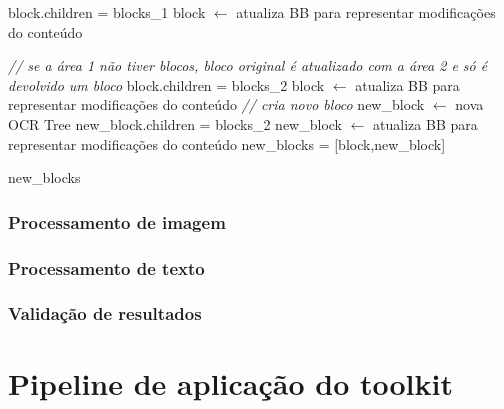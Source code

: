\begin{breakablealgorithm}
\begin{algorithmic}[1]
			\STATE block.children = blocks\_1
			\STATE block $\leftarrow$ atualiza BB para representar modificações do conteúdo
			
		\ELSE
			\STATE \textit{// se a área 1 não tiver blocos, bloco original é atualizado com a área 2 e só é devolvido um bloco}
				\STATE block.children = blocks\_2
				\STATE block $\leftarrow$ atualiza BB para representar modificações do conteúdo
			\ELSE
				\STATE \textit{// cria novo bloco}
				\STATE new\_block $\leftarrow$ nova OCR Tree
				\STATE new\_block.children = blocks\_2
				\STATE new\_block $\leftarrow$ atualiza BB para representar modificações do conteúdo
				\STATE new\_blocks = [block,new\_block]
				
			\ENDIF
			
		\ENDIF
		
		\RETURN new\_blocks
		
	\end{algorithmic}
\end{breakablealgorithm}




\label{contribution_reading_order}

\label{contribution_result_segmentation}



\subsubsection{Processamento de imagem}
\label{contribution_image_processing}

\subsubsection{Processamento de texto}
\label{contribution_text_processing}


\subsubsection{Validação de resultados}
\label{contribution_results_validation}




\section{Pipeline de aplicação do toolkit}
\label{contribution_toolkit_pipeline}


